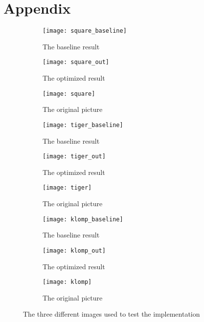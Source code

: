 \section{Appendix}
\begin{figure*}[h!]
    \centering
    \begin{subfigure}[b]{0.3\textwidth}
            \texttt{[image: square\_baseline]}
            \caption{The baseline result}
            \label{fig:app_square_baseline}
    \end{subfigure}
    \begin{subfigure}[b]{0.3\textwidth}
            \texttt{[image: square\_out]}
            \caption{The optimized result}
            \label{fig:app_square_out}
    \end{subfigure}
    \begin{subfigure}[b]{0.3\textwidth}
            \texttt{[image: square]}
            \caption{The original picture}
            \label{fig:app_square}
    \end{subfigure}

    \begin{subfigure}[b]{0.3\textwidth}
            \texttt{[image: tiger\_baseline]}
            \caption{The baseline result}
            \label{fig:app_tiger_baseline}
    \end{subfigure}
    \begin{subfigure}[b]{0.3\textwidth}
            \texttt{[image: tiger\_out]}
            \caption{The optimized result}
            \label{fig:app_tiger_out}
    \end{subfigure}
    \begin{subfigure}[b]{0.3\textwidth}
            \texttt{[image: tiger]}
            \caption{The original picture}
            \label{fig:app_tiger}
    \end{subfigure}

    \begin{subfigure}[b]{0.3\textwidth}
            \texttt{[image: klomp\_baseline]}
            \caption{The baseline result}
            \label{fig:app_klomp_baseline}
    \end{subfigure}
    \begin{subfigure}[b]{0.3\textwidth}
            \texttt{[image: klomp\_out]}
            \caption{The optimized result}
            \label{fig:app_klomp_out}
    \end{subfigure}
    \begin{subfigure}[b]{0.3\textwidth}
            \texttt{[image: klomp]}
            \caption{The original picture}
            \label{fig:app_klomp}
    \end{subfigure}
    \caption{The three different images used to test the implementation}
    \label{fig:imgdiff}
\end{figure*}
